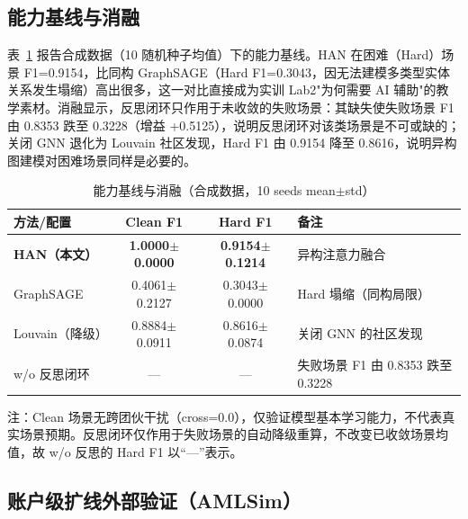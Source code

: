 \documentclass[12pt,a4paper]{ctexart}
\begin{document}
\subsection{能力基线与消融}

表~\ref{tab:baselines} 报告合成数据（10 随机种子均值）下的能力基线。HAN 在困难（Hard）场景 F1=0.9154，比同构 GraphSAGE（Hard F1=0.3043，因无法建模多类型实体关系发生塌缩）高出很多，这一对比直接成为实训 Lab2"为何需要 AI 辅助"的教学素材。消融显示，反思闭环只作用于未收敛的失败场景：其缺失使失败场景 F1 由 0.8353 跌至 0.3228（增益 +0.5125），说明反思闭环对该类场景是不可或缺的；关闭 GNN 退化为 Louvain 社区发现，Hard F1 由 0.9154 降至 0.8616，说明异构图建模对困难场景同样是必要的。

\begin{table}[htbp]
  \centering
  \caption{能力基线与消融（合成数据，10 seeds mean$\pm$std）}
  \label{tab:baselines}
  \begin{tabular}{lccp{3.2cm}}
    \toprule
    方法/配置 & Clean F1 & Hard F1 & 备注 \\
    \midrule
    \textbf{HAN（本文）} & \textbf{1.0000$\pm$0.0000} & \textbf{0.9154$\pm$0.1214} & 异构注意力融合 \\
    GraphSAGE & 0.4061$\pm$0.2127 & 0.3043$\pm$0.0000 & Hard 塌缩（同构局限） \\
    Louvain（降级） & 0.8884$\pm$0.0911 & 0.8616$\pm$0.0874 & 关闭 GNN 的社区发现 \\
    w/o 反思闭环 & — & — & 失败场景 F1 由 0.8353 跌至 0.3228 \\
    \bottomrule
  \end{tabular}
  \par\vspace{1.5\baselineskip}
  \begin{minipage}{\textwidth}
  \footnotesize
  \noindent 注：Clean 场景无跨团伙干扰（cross=0.0），仅验证模型基本学习能力，不代表真实场景预期。反思闭环仅作用于失败场景的自动降级重算，不改变已收敛场景均值，故 w/o 反思的 Hard F1 以“—”表示。
  \end{minipage}
\end{table}

\subsection{账户级扩线外部验证（AMLSim）}
\label{sec:amlsim}
\end{document}
